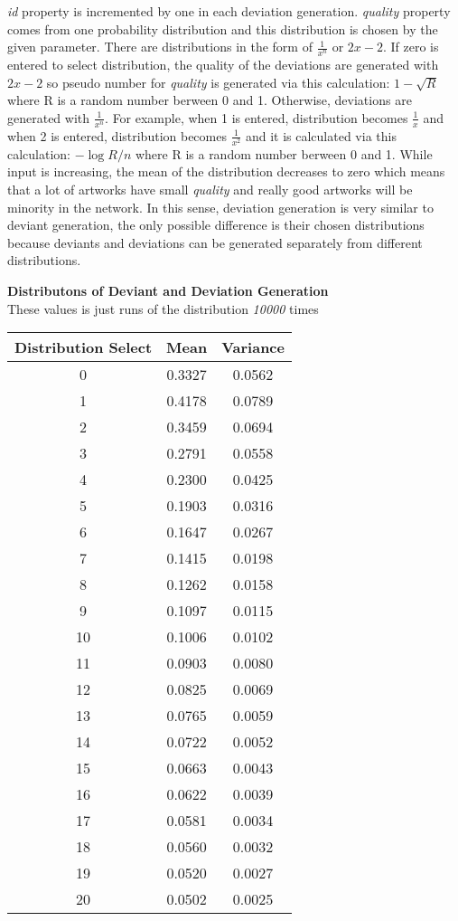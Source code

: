 \documentclass[12pt,a4paper]{report}
\begin{document}
	\hspace{0.6cm}\emph{id} property is incremented by one in each deviation generation. \emph{quality} property comes from one probability distribution and this distribution is chosen by the given parameter. There are distributions in the form of $\frac{1}{x^n}$ or $2x - 2$. If zero is entered to select distribution, the quality of the deviations are generated with $2x - 2$ so pseudo number for \emph{quality} is generated via this calculation: $1 - \sqrt R $ where R is a random number berween 0 and 1. Otherwise, deviations are generated with $\frac{1}{x^n}$. For example, when 1 is entered, distribution becomes $\frac{1}{x}$ and when 2 is entered, distribution becomes $\frac{1}{x^2}$ and it is calculated via this calculation: $-\log R/ n$ where R is a random number berween 0 and 1. While input is increasing, the mean of the distribution decreases to zero which means that a lot of artworks have small \emph{quality} and really good artworks will be minority in the network.   In this sense, deviation generation is very similar to deviant generation, the only possible difference is their chosen distributions because deviants and deviations can be generated separately from different distributions. \\

\begin{center}
\textup{\textbf{Distributons of Deviant and Deviation Generation\\}}
\textup{These values is just runs of the distribution \emph{10000} times}
\begin{tabular}{|c|c|c|}
\hline
\textbf{Distribution Select} & \textbf{Mean} & \textbf{Variance} \\
\hline
0 & 0.3327 & 0.0562\\
\hline
1 & 0.4178 & 0.0789 \\
\hline
2 & 0.3459 & 0.0694 \\
\hline
3 & 0.2791 & 0.0558 \\
\hline
4 & 0.2300 & 0.0425 \\
\hline
5 & 0.1903 & 0.0316 \\
\hline
6 & 0.1647 & 0.0267 \\
\hline
7 & 0.1415 & 0.0198 \\
\hline
8 & 0.1262 & 0.0158 \\
\hline
9 & 0.1097 & 0.0115 \\
\hline
10 & 0.1006 & 0.0102 \\
\hline
11 & 0.0903 & 0.0080 \\
\hline
12 & 0.0825 & 0.0069 \\
\hline
13 & 0.0765 & 0.0059 \\
\hline
14 & 0.0722 & 0.0052 \\
\hline
15 & 0.0663 & 0.0043 \\
\hline
16 & 0.0622 & 0.0039 \\
\hline
17 & 0.0581 & 0.0034 \\
\hline
18 & 0.0560 & 0.0032 \\
\hline
19 & 0.0520 & 0.0027 \\
\hline
20 & 0.0502 & 0.0025 \\
\hline
\end{tabular}
\end{center}
\end{document}
